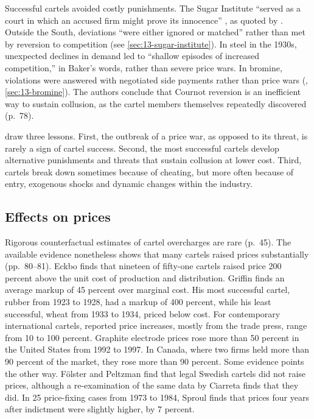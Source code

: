 Successful cartels avoided costly punishments. The Sugar Institute ``served as a court in which an accused firm might
prove its innocence'' \citep[p.~389]{GenesoveMullin2001}, as quoted by \citet[p.~78]{LevensteinSuslow2006}. Outside
the South, deviations ``were either ignored or matched'' rather than met by reversion to competition
\citep[pp.~390--391]{GenesoveMullin2001} (see \cref{sec:13-sugar-institute}). In steel in the 1930s, unexpected
declines in demand led to ``shallow episodes of increased competition,'' in Baker's words, rather than severe price
wars. In bromine, violations were answered with negotiated side payments rather than price wars
(\citealp{Levenstein1997}, \cref{sec:13-bromine}). The authors conclude that Cournot reversion is an inefficient way to
sustain collusion, as the cartel members themselves repeatedly discovered (p.~78).

\citet[p.~79]{LevensteinSuslow2006} draw three lessons. First, the outbreak of a price war, as opposed to its threat,
is rarely a sign of cartel success. Second, the most successful cartels develop alternative punishments and threats
that sustain collusion at lower cost. Third, cartels break down sometimes because of cheating, but more often because
of entry, exogenous shocks and dynamic changes within the industry.

\subsection{Effects on prices}\label{sec:12-ls-prices}

Rigorous counterfactual estimates of cartel overcharges are rare (p.~45). The available evidence nonetheless shows that
many cartels raised prices substantially (pp.~80--81). Eckbo finds that nineteen of fifty-one cartels raised price 200
percent above the unit cost of production and distribution. Griffin finds an average markup of 45 percent over marginal
cost. His most successful cartel, rubber from 1923 to 1928, had a markup of 400 percent, while his least successful,
wheat from 1933 to 1934, priced below cost. For contemporary international cartels, reported price increases, mostly
from the trade press, range from 10 to 100 percent. Graphite electrode prices rose more than 50 percent in the United
States from 1992 to 1997. In Canada, where two firms held more than 90 percent of the market, they rose more than 90
percent. Some evidence points the other way. Fölster and Peltzman find that legal Swedish cartels did not raise prices,
although a re-examination of the same data by Ciarreta finds that they did. In 25 price-fixing cases from 1973 to 1984,
Sproul finds that prices four years after indictment were slightly higher, by 7 percent.

